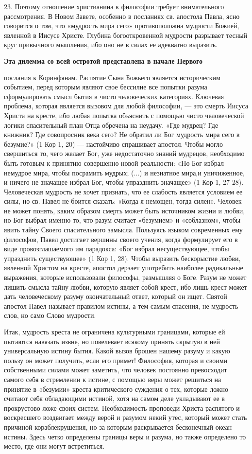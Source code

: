 \documentclass[a5paper,10pt]{article}
\begin{document}
23. Поэтому отношение христианина к философии требует внимательного
рассмотрения. В Новом Завете, особенно в посланиях св. апостола Павла, ясно
говорится о том, что «мудрость мира сего» противоположна мудрости Божией,
явленной в Иисусе Христе. Глубина богооткровенной мудрости разрывает тесный
круг привычного мышления, ибо оно не в силах ее адекватно выразить.

\textbf{Эта дилемма со всей остротой представлена в начале Первого}

послания к Коринфянам. Распятие Сына Божьего является историческим событием,
перед которым являют свое бессилие все попытки разума сформулировать смысл
бытия в чисто человеческих категориях. Ключевая проблема, которая является
вызовом для любой философии, — это смерть Иисуса Христа на кресте, ибо любая
попытка объяснить с помощью чисто человеческой логики спасительный план Отца
обречена на неудачу. «Где мудрец? Где книжник? Где совопросник века сего? Не
обратил ли Бог мудрость мира сего в безумие?» (1 Кор 1, 20) — настойчиво
спрашивает апостол. Чтобы могло свершиться то, чего желает Бог, уже
недостаточно знаний мудрецов, необходимо быть готовым к принятию совершенно
новой реальности: «Но Бог избрал немудрое мира, чтобы посрамить мудрых; (...) и
незнатное мира,и уничиженное, и ничего не значащее избрал Бог, чтобы упразднить
значащее» (1 Кор 1, 27-28). Человеческая мудрость не хочет признать, что ее
слабость является условием ее силы, но св. Павел не боится сказать: «Когда я
немощен, тогда силен». Человек не может понять, каким образом смерть может быть
источником жизни и любви, но Бог выбрал именно то, что разум считает «безумием»
и «соблазном», чтобы явить тайну Своего спасительного замысла. Пользуясь языком
современных ему философов, Павел достигает вершины своего учения, когда
формулирует его в виде провозглашаемого им парадокса: «Бог избрал
несуществующее, чтобы упразднить существующее» (1 Кор 1, 28). Чтобы выразить
бескорыстие любви, явленной Христом на кресте, апостол дерзает употребить
наиболее радикальные выражения, которые использовали философы, размышляя о
Боге. Разум не может лишить смысла тайну любви, которую являет собой крест, ибо
лишь крест может дать человеческому разуму окончательный ответ, который он
ищет. Святой апостол Павел называет правилом истины, а тем самым спасения, не
мудрость слов, но само Слово мудрости.

Итак, мудрость креста не ограничена культурными границами, которые ей пытаются
навязать извне, но повелевает всякому принять скрытую в ней универсальную
истину бытия. Какой вызов брошен нашему разуму и какую пользу он может
получить, если его примет! Философия, которая и своими собственными силами
может заметить, что человек постоянно превосходит самого себя в стремлении к
истине, с помощью веры может решиться на принятие в «безумии» креста
критического суждения о тех, которые ложно считают себя обладающими истиной,
хотя на самом деле укладывают ее в прокрустово ложе своих систем.
Необходимость проповеди Христа распятого и воскресшего воздвигает между верой и
разумом некий утес, который может стать причиной кораблекрушения, но за которым
раскрывается бесконечный океан истины. Здесь четко определены границы веры и
разума, но также определено то место, где они могут встретиться.
\end{document}
